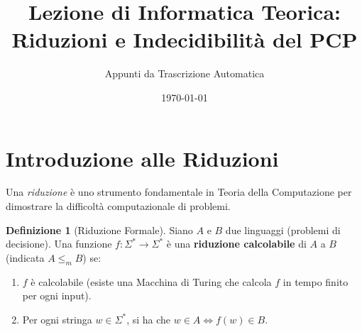 \documentclass[a4paper]{article}
\title{Lezione di Informatica Teorica: Riduzioni e Indecidibilità del PCP}
\author{Appunti da Trascrizione Automatica}
\date{\today}
\theoremstyle{definition} %
\newtheorem{definition}{Definizione}
\theoremstyle{remark} %
\begin{document}
\maketitle
\tableofcontents
\newpage

\section{Introduzione alle Riduzioni}

Una \emph{riduzione} è uno strumento fondamentale in Teoria della Computazione per dimostrare la difficoltà computazionale di problemi.

\begin{definition}[Riduzione Formale]
Siano $A$ e $B$ due linguaggi (problemi di decisione). Una funzione $f: \Sigma^* \to \Sigma^*$ è una \textbf{riduzione calcolabile} di $A$ a $B$ (indicata $A \le_m B$) se:
\begin{enumerate}
    \item $f$ è calcolabile (esiste una Macchina di Turing che calcola $f$ in tempo finito per ogni input).
    \item Per ogni stringa $w \in \Sigma^*$, si ha che $w \in A \iff f(w) \in B$.
\end{enumerate}
\end{definition}
\end{document}
